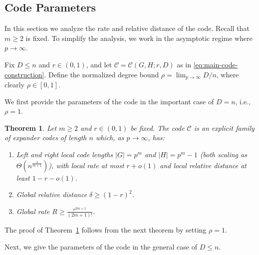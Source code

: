 \documentclass[11pt]{article}
\theoremstyle{plain}
\newtheorem{theorem}{Theorem}[section]
\theoremstyle{definition}
\begin{document}
   
\subsection{Code Parameters}
In this section we analyze the rate and relative distance of the code. 
Recall that $m \ge 2$ is fixed. To simplify the analysis, we work in the asymptotic regime where     $p \to \infty$.



Fix $D\leq n$ and $r\in (0,1)$, and let 
$\mathcal{C}=\mathcal{C}(G, H;r,D)$ as in \eqref{eq:main-code-construction}.
 Define the normalized degree bound $\rho = \lim_{p\to\infty} D/n$, where clearly $\rho \in [0, 1]$.  

We first provide the parameters of the code in the important case of $D=n$, i.e., $\rho=1$. 

\begin{theorem}
\label{thm:optimized_construction2}
Let $m \ge 2$ and $r \in (0, 1)$ be fixed. The code $\mathcal{C}$ is an explicit family of expander codes of length $n$ which, as $p \to \infty$, has:
\begin{enumerate}
    \item Left and right local code lengths $|G| = p^m$ and $|H| = p^m-1$ (both scaling as $\Theta(n^{\frac{1}{m+1}})$), with local rate at most $r+o(1)$ and local relative distance at least $1-r-o(1)$.
    \item Global relative distance $\delta \ge (1-r)^2$.
    \item Global rate $R \ge \frac{r^{2m+1}}{(2m+1)!}$.
\end{enumerate}
\end{theorem}

The proof of Theorem~\ref{thm:optimized_construction2} follows from the next theorem by setting $\rho=1.$

Next, we give the parameters of the code in the general case of $D\leq n$. 
\end{document}
